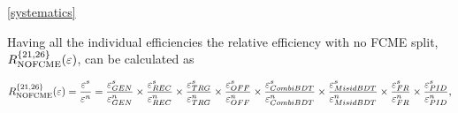 \DIFaddbegin {}\autoref{systematics} 

\DIFaddend Having all the individual efficiencies the relative efficiency with no FCME split, $R_{\rm{NOFCME}}^{\{21,26\}}(\varepsilon)$, can be calculated as 


\hspace*{-1.0cm}\begin{equation}
	R_{\rm{NOFCME}}^{\{21,26\}}(\varepsilon)=\frac{\varepsilon^{s}}{\varepsilon^{n}}=\frac{\varepsilon_{GEN}^{s}}{\varepsilon_{GEN}^{n}} \times \frac{\varepsilon_{REC}^{s}}{\varepsilon_{REC}^{n}} \times \frac{\varepsilon_{TRG}^{s}}{\varepsilon_{TRG}^{n}} \times \frac{\varepsilon_{OFF}^{s}}{\varepsilon_{OFF}^{n}} \times \frac{\varepsilon_{CombiBDT}^{s}}{\varepsilon_{CombiBDT}^{n}} \times \frac{\varepsilon_{MisidBDT}^{s}}{\varepsilon_{MisidBDT}^{n}} \times \frac{\varepsilon_{FR}^{s}}{\varepsilon_{FR}^{n}} \times \frac{\varepsilon_{PID}^{s}}{\varepsilon_{PID}^{n}},
\label{eq:notsplitted}
\end{equation}


